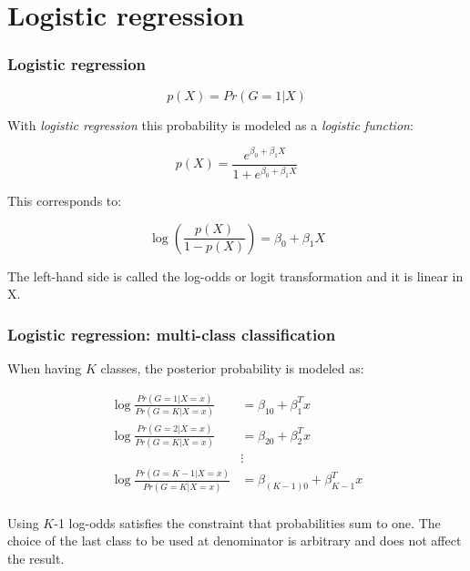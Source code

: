 \documentclass[notes]{beamer}          %
\begin{document}
\section{Logistic regression}
\begin{frame}
\frametitle{Logistic regression}

\begin{equation*}
p(X) = Pr(G = 1|X)
\end{equation*}

With \textit{logistic regression} this probability is modeled as a \textit{logistic function}:

\begin{equation*}
p(X) = \frac{e^{\beta_0 + \beta_1X}}{1+e^{\beta_0 + \beta_1X}}
\end{equation*}

This corresponds to:

\begin{equation*}
\log \left(\frac{p(X)}{1-p(X)}\right)  = \beta_0 + \beta_1X
\end{equation*}

The left-hand side is called the log-odds or logit transformation and it is linear in X.

\end{frame}

\begin{frame}
\frametitle{Logistic regression: multi-class classification}

When having $K$ classes, the posterior probability is modeled as:

\begin{align*}
\log \frac{Pr(G=1 | X=x)}{Pr(G=K | X=x)} &= \beta_{10} + \beta_1^T x \\
\log \frac{Pr(G=2 | X=x)}{Pr(G=K | X=x)} &= \beta_{20} + \beta_2^T x \\
 & \vdots \\
\log \frac{Pr(G=K-1 | X=x)}{Pr(G=K | X=x)} &= \beta_{(K-1)0} + \beta_{K-1}^T x \\
\end{align*}

Using $K$-1 log-odds satisfies the constraint that probabilities sum to one. The choice of the last class to be used at denominator is arbitrary and does not affect the result.

\end{frame}
\end{document}
